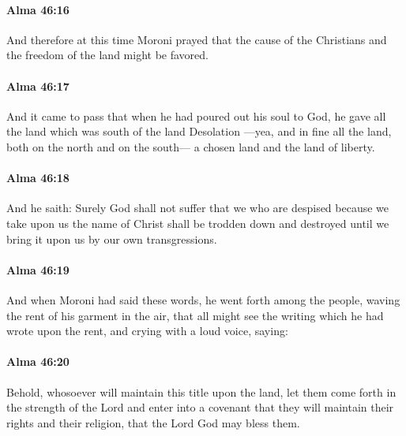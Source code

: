 		\paragraph{Alma 46:16} %
			\label{ALMA-46-16}

			And therefore at this time Moroni prayed
			that the cause of the Christians and the freedom of the land might be favored.

		\paragraph{Alma 46:17} %
			\label{ALMA-46-17}

			And it came to pass that when he had poured out his soul to God,
			he gave all the land which was south of the land Desolation
			---yea, and in fine all the land, both on the north and on the south---
			a chosen land and the land of liberty.

		\paragraph{Alma 46:18} %
			\label{ALMA-46-18}

			And he saith:
			Surely God shall not suffer that we who are despised
			because we take upon us the name of Christ
			shall be trodden down and destroyed
			until we bring it upon us by our own transgressions.

		\paragraph{Alma 46:19} %
			\label{ALMA-46-19}

			And when Moroni had said these words,
			he went forth among the people,
			waving the rent of his garment in the air,
			that all might see the writing which he had wrote upon the rent,
			and crying with a loud voice, saying:

		\paragraph{Alma 46:20} %
			\label{ALMA-46-20}

			Behold, whosoever will maintain this title upon the land,
			let them come forth in the strength of the Lord
			and enter into a covenant
			that they will maintain their rights and their religion,
			that the Lord God may bless them.

